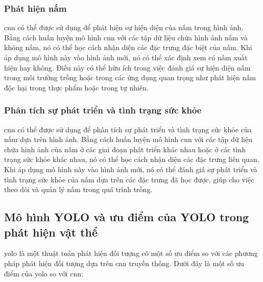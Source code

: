 \subsubsection{Phát hiện nấm}
\acrshort{cnn} có thể được sử dụng để phát hiện sự hiện diện của nấm trong hình ảnh. Bằng cách huấn luyện mô hình \acrshort{cnn} với các tập dữ liệu chứa hình ảnh nấm và không nấm, nó có thể học cách nhận diện các đặc trưng đặc biệt của nấm. Khi áp dụng mô hình này vào hình ảnh mới, nó có thể xác định xem có nấm xuất hiện hay không. Điều này có thể hữu ích trong việc đánh giá sự hiện diện nấm trong môi trường trồng hoặc trong các ứng dụng quan trọng như phát hiện nấm độc hại trong thực phẩm hoặc trong tự nhiên.

\subsubsection{Phân tích sự phát triển và tình trạng sức khỏe}
\acrshort{cnn} có thể được sử dụng để phân tích sự phát triển và tình trạng sức khỏe của nấm dựa trên hình ảnh. Bằng cách huấn luyện mô hình \acrshort{cnn} với các tập dữ liệu chứa hình ảnh của nấm ở các giai đoạn phát triển khác nhau hoặc ở các tình trạng sức khỏe khác nhau, nó có thể học cách nhận diện các đặc trưng liên quan. Khi áp dụng mô hình này vào hình ảnh mới, nó có thể đánh giá sự phát triển và tình trạng sức khỏe của nấm dựa trên các đặc trưng đã học được, giúp cho việc theo dõi và quản lý nấm trong quá trình trồng.

\subsection{Mô hình YOLO và ưu điểm của YOLO trong phát hiện vật thể}

\acrfull{yolo} là một thuật toán phát hiện đối tượng có một số ưu điểm so với các phương pháp phát hiện đối tượng dựa trên \acrshort{cnn} truyền thống. Dưới đây là một số ưu điểm của \acrfull{yolo} so với \acrshort{cnn}:

